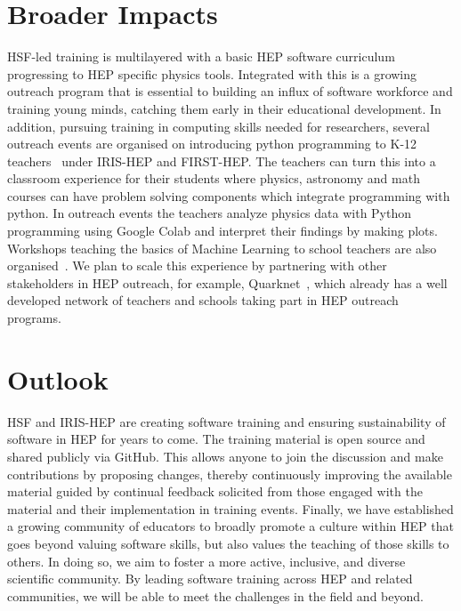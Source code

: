 \documentclass[twocolumn]{svjour3}          %
\begin{document}
\section{Broader Impacts}\label{sec:BroaderImpacts}

HSF-led training is multilayered with a basic HEP software curriculum progressing to HEP specific physics tools. Integrated with this is a growing outreach program that is essential to building an influx of software workforce and training young minds, catching them early in their educational development. In addition, pursuing training in computing skills needed for researchers, several outreach events are organised on introducing python programming to K-12 teachers~\cite{HSF-training-DA-STEM-PR-2020} under IRIS-HEP and FIRST-HEP. The teachers can turn this into a classroom experience for their students where physics, astronomy and math courses can have problem solving components which integrate programming with python. In outreach events the teachers analyze physics data with Python programming using Google Colab and interpret their findings by making plots. Workshops teaching the basics of Machine Learning to school teachers are also organised~\cite{HSF-training-ML-STEM-PR-2021}. We plan to scale this experience by partnering with other stakeholders in HEP outreach, for example, Quarknet~\cite{quarknet}, which already has a well developed network of teachers and schools taking part in HEP outreach programs.

\section{Outlook}\label{sec:Outlook}

HSF and IRIS-HEP are creating software training and ensuring sustainability of software in HEP for years to come. The training material is open source and shared publicly via GitHub. This allows anyone to join the discussion and make contributions by proposing changes, thereby continuously improving the available material guided by continual feedback solicited from those engaged with the material and their implementation in training events. Finally, we have established a growing community of educators to broadly promote a culture within HEP that goes beyond valuing software skills, but also values the teaching of those skills to others. In doing so, we aim to foster a more active, inclusive, and diverse scientific community.  By leading software training across HEP and related communities, we will be able to meet the challenges in the field and beyond.
\end{document}
